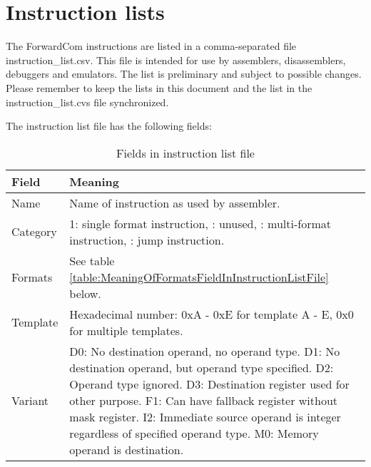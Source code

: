\documentclass[forwardcom.tex]{subfiles}
\begin{document}
\RaggedRight

\chapter{Instruction lists}\label{chap:InstructionLists}
The ForwardCom instructions are listed in a comma-separated file instruction\_list.csv. This file is intended for use by assemblers, disassemblers, debuggers and emulators. The list is preliminary and subject to possible changes. Please remember to keep the lists in this document and the list in the instruction\_list.cvs file synchronized.
\vspace{2mm}

The instruction list file has the following fields:

\begin{longtable} {|p{18mm}|p{100mm}|}
\caption{Fields in instruction list file} 
\label{table:fieldsInInstructionListFile}
\\
\endfirsthead
\endhead
\hline
\bfseries Field & \bfseries Meaning  \\
\hline
Name & Name of instruction as used by assembler.  \\
\hline
Category & 1: single format instruction, \newline
           2: unused,  \newline
           3: multi-format instruction,  \newline
           4: jump instruction. \\
\hline
Formats & See table \ref{table:MeaningOfFormatsFieldInInstructionListFile} below.  \\
\hline
Template & Hexadecimal number:  \newline
           0xA - 0xE for template A - E,  \newline
           0x0 for multiple templates. \\
\hline
Variant & 
D0:  No destination operand, no operand type.\newline
D1:  No destination operand, but operand type specified.\newline
D2:  Operand type ignored.\newline
D3:  Destination register used for other purpose.\newline
F1:  Can have fallback register without mask register.\newline
I2:  Immediate source operand is integer regardless of specified operand type.\newline
M0:  Memory operand is destination.\newline

\end{longtable}
\end{document}
